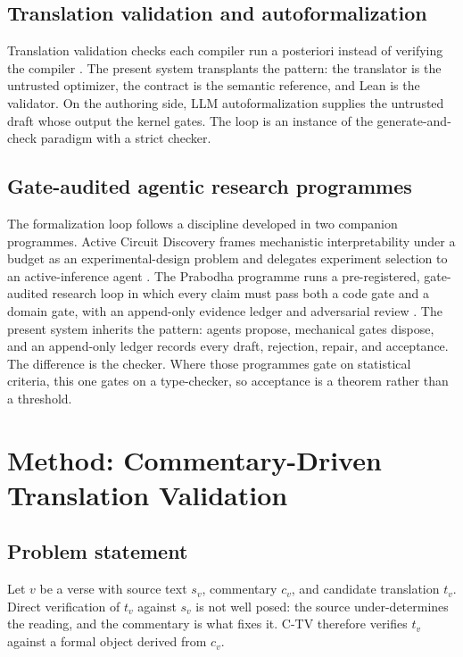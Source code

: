 \documentclass[11pt]{article}
\begin{document}
\subsection{Translation validation and autoformalization}
Translation validation checks each compiler run a posteriori instead of
verifying the compiler \citep{pnueli1998translation, tristan2008validators}.
The present system transplants the pattern: the translator is the untrusted
optimizer, the contract is the semantic reference, and Lean is the validator.
On the authoring side, LLM autoformalization \citep{wu2022autoformalization,
pathak2024gflean} supplies the untrusted draft whose output the kernel gates.
The loop is an instance of the generate-and-check paradigm with a strict
checker.

\subsection{Gate-audited agentic research programmes}
The formalization loop follows a discipline developed in two companion
programmes. Active Circuit Discovery frames mechanistic interpretability
under a budget as an experimental-design problem and delegates experiment
selection to an active-inference agent \citep{sathish2026acd}. The Prabodha
programme runs a pre-registered, gate-audited research loop in which every
claim must pass both a code gate and a domain gate, with an append-only
evidence ledger and adversarial review \citep{sathish2026prabodha}. The
present system inherits the pattern: agents propose, mechanical gates
dispose, and an append-only ledger records every draft, rejection, repair,
and acceptance. The difference is the checker. Where those programmes gate on
statistical criteria, this one gates on a type-checker, so acceptance is a
theorem rather than a threshold.

\section{Method: Commentary-Driven Translation Validation}
\label{sec:method}

\subsection{Problem statement}
Let $v$ be a verse with source text $s_v$, commentary $c_v$, and candidate
translation $t_v$. Direct verification of $t_v$ against $s_v$ is not well
posed: the source under-determines the reading, and the commentary is what
fixes it. C-TV therefore verifies $t_v$ against a formal object derived from
$c_v$.
\end{document}
